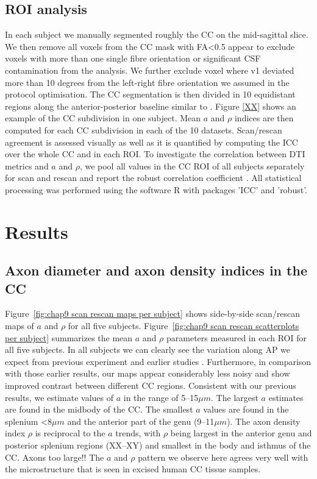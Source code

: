 \subsection*{ROI analysis} In each subject we manually segmented roughly the CC on the mid-sagittal slice. We then remove all voxels from the CC mask with FA<0.5 appear to exclude voxels with more than one single fibre orientation or significant CSF contamination from the analysis. We further exclude voxel where v1 deviated more than 10 degrees from the left-right fibre orientation we assumed in the protocol optimisation. The CC segmentation is then divided in 10 equidistant regions along the anterior-posterior baseline similar to \cite{Aboitiz}. Figure \ref{XX} shows an example of the CC subdivision in one subject. Mean $a$ and $\rho$ indices are then computed for each CC subdivision in each of the 10 datasets. Scan/rescan agreement is assessed visually as well as it is quantified by computing the \gls{ICC} \citep{Shrout:1979} over the whole CC and in each \gls{ROI}. To investigate the correlation between DTI metrics and $a$ and $\rho$, we pool all values in the CC ROI of all subjects separately for scan and rescan and report the robust correlation coefficient \citep{XX}. All statistical processing was performed using the software R\citep{RCoreTeam:2012} with packages 'ICC'\citep{Wolak:2011} and 'robust'\citep{Wang:2012}.
\FloatBarrier
\section{Results}
\subsection*{Axon diameter and axon density indices in the CC}
Figure~\ref{fig:chap9 scan rescan maps per subject} shows side-by-side scan/rescan maps of $a$ and $\rho$ for all five subjects. Figure~\ref{fig:chap9 scan rescan scatterplots per subject} summarizes the mean $a$ and $\rho$ parameters measured in each ROI for all five subjects. In all subjects we can clearly see the variation along AP we expect from previous experiment and earlier studies \citep{Alexander:2010}. Furthermore, in comparison with those earlier results, our maps appear considerably less noisy and show improved contrast between different CC regions. Consistent with our previous results, we estimate values of $a$ in the range of 5--15$\mu m$. The largest $a$ estimates are found in the midbody of the CC. The smallest $a$ values are found in the splenium <8$\mu m$ and the anterior part of the genu (9--11$\mu m$). The axon density index $\rho$ is reciprocal to the $a$ trends, with $\rho$ being largest in the anterior genu and posterior splenium regions  (XX--XY) and smallest in the body and isthmus of the CC. Axons too large!! The $a$ and $\rho$ pattern we observe here agrees very well with the microstructure that is seen in excised human CC tissue samples.


